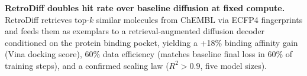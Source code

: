\caption{\textbf{RetroDiff doubles hit rate over baseline diffusion at fixed compute.} RetroDiff retrieves top-$k$ similar molecules from ChEMBL via ECFP4 fingerprints and feeds them as exemplars to a retrieval-augmented diffusion decoder conditioned on the protein binding pocket, yielding a +18\% binding affinity gain (Vina docking score), 60\% data efficiency (matches baseline final loss in 60\% of training steps), and a confirmed scaling law ($R^{2} > 0.9$, five model sizes).}
